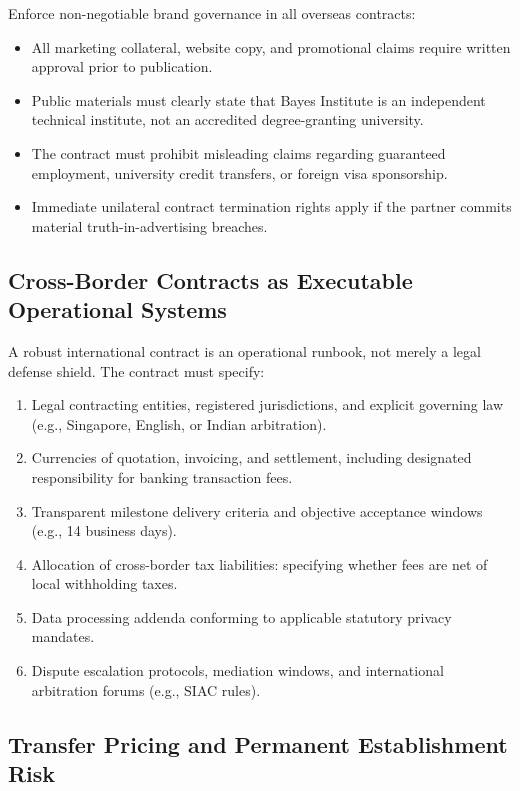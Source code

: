 Enforce non-negotiable brand governance in all overseas contracts:
\begin{itemize}
\item All marketing collateral, website copy, and promotional claims require written approval prior to publication.
\item Public materials must clearly state that Bayes Institute is an independent technical institute, not an accredited degree-granting university.
\item The contract must prohibit misleading claims regarding guaranteed employment, university credit transfers, or foreign visa sponsorship.
\item Immediate unilateral contract termination rights apply if the partner commits material truth-in-advertising breaches.
\end{itemize}

\subsection{Cross-Border Contracts as Executable Operational Systems}
\label{sec:cross_border_contracts_as_systems}

A robust international contract is an operational runbook, not merely a legal defense shield. The contract must specify:
\begin{enumerate}
\item Legal contracting entities, registered jurisdictions, and explicit governing law (e.g., Singapore, English, or Indian arbitration).
\item Currencies of quotation, invoicing, and settlement, including designated responsibility for banking transaction fees.
\item Transparent milestone delivery criteria and objective acceptance windows (e.g., 14 business days).
\item Allocation of cross-border tax liabilities: specifying whether fees are net of local withholding taxes.
\item Data processing addenda conforming to applicable statutory privacy mandates.
\item Dispute escalation protocols, mediation windows, and international arbitration forums (e.g., SIAC rules).
\end{enumerate}

\subsection{Transfer Pricing and Permanent Establishment Risk}
\label{sec:transfer_pricing_pe_risk}

